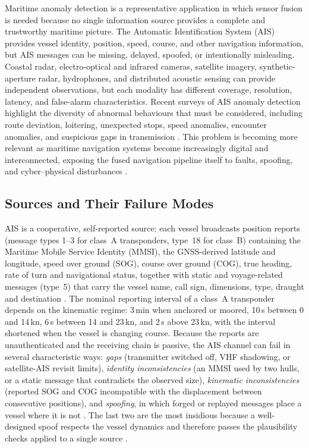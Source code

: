 \documentclass[graybox,envcountchap]{style/SNmono}
\begin{document}
Maritime anomaly detection is a representative application in which sensor fusion is needed because no single information source provides a complete and trustworthy maritime picture. The Automatic Identification System (AIS) provides vessel identity, position, speed, course, and other navigation information, but AIS messages can be missing, delayed, spoofed, or intentionally misleading. Coastal radar, electro-optical and infrared cameras, satellite imagery, synthetic-aperture radar, hydrophones, and distributed acoustic sensing can provide independent observations, but each modality has different coverage, resolution, latency, and false-alarm characteristics. Recent surveys of AIS anomaly detection highlight the diversity of abnormal behaviours that must be considered, including route deviation, loitering, unexpected stops, speed anomalies, encounter anomalies, and suspicious gaps in transmission \cite{wolsing_anomaly_2022}. This problem is becoming more relevant as maritime navigation systems become increasingly digital and interconnected, exposing the fused navigation pipeline itself to faults, spoofing, and cyber--physical disturbances \cite{oliva_innovation_2026}.
\subsection{Sources and Their Failure Modes}
AIS is a cooperative, self-reported source: each vessel broadcasts position reports (message types 1--3 for class~A transponders, type~18 for class~B) containing the Maritime Mobile Service Identity (MMSI), the GNSS-derived latitude and longitude, speed over ground (SOG), course over ground (COG), true heading, rate of turn and navigational status, together with static and voyage-related messages (type~5) that carry the vessel name, call sign, dimensions, type, draught and destination \cite{itu_m1371_2014}. The nominal reporting interval of a class~A transponder depends on the kinematic regime: 3\,min when anchored or moored, 10\,s between 0 and 14\,kn, $6$\,s between 14 and 23\,kn, and 2\,s above 23\,kn, with the interval shortened when the vessel is changing course. Because the reports are unauthenticated and the receiving chain is passive, the AIS channel can fail in several characteristic ways: \emph{gaps} (transmitter switched off, VHF shadowing, or satellite-AIS revisit limits), \emph{identity inconsistencies} (an MMSI used by two hulls, or a static message that contradicts the observed size), \emph{kinematic inconsistencies} (reported SOG and COG incompatible with the displacement between consecutive positions), and \emph{spoofing}, in which forged or replayed messages place a vessel where it is not \cite{balduzzi_ais_2014}. The last two are the most insidious because a well-designed spoof respects the vessel dynamics and therefore passes the plausibility checks applied to a single source \cite{riveiro_review_2018}.
\end{document}

